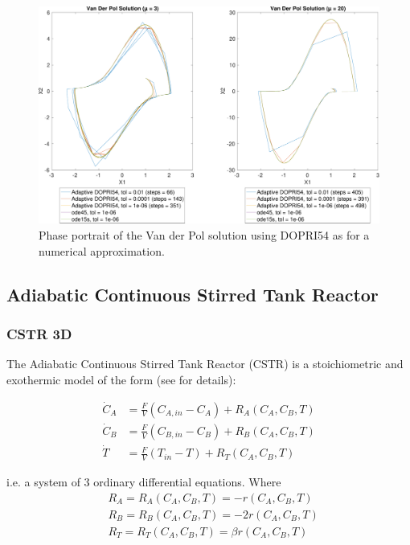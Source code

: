 \begin{figure}[h]
    \centering
    \includegraphics[width=\textwidth]{plots/6_5.pdf}
    \caption{Phase portrait of the Van der Pol solution using DOPRI54 as for a numerical approximation.}
    \label{fig:6_4}
\end{figure}






\subsection{Adiabatic Continuous Stirred Tank Reactor}
\subsubsection*{CSTR 3D}
The Adiabatic Continuous Stirred Tank Reactor (CSTR) is a stoichiometric and exothermic model of the form (see \cite{Wahlgreen2020NonlinearCSTR} for details):

\begin{equation}
\begin{aligned}
\dot{C}_{A} &=\frac{F}{V}\left(C_{A, i n}-C_{A}\right)+R_{A}\left(C_{A}, C_{B}, T\right) \\
\dot{C}_{B} &=\frac{F}{V}\left(C_{B, i n}-C_{B}\right)+R_{B}\left(C_{A}, C_{B}, T\right) \\
\dot{T} &=\frac{F}{V}\left(T_{i n}-T\right)+R_{T}\left(C_{A}, C_{B}, T\right)
\end{aligned}
\end{equation}

i.e. a system of 3 ordinary differential equations. Where
\begin{equation}
\begin{aligned}
&R_{A}=R_{A}\left(C_{A}, C_{B}, T\right)=-r\left(C_{A}, C_{B}, T\right) \\
&R_{B}=R_{B}\left(C_{A}, C_{B}, T\right)=-2 r\left(C_{A}, C_{B}, T\right)\\
&R_{T}=R_{T}\left(C_{A}, C_{B}, T\right)=\beta r\left(C_{A}, C_{B}, T\right)
\end{aligned}
\end{equation}

